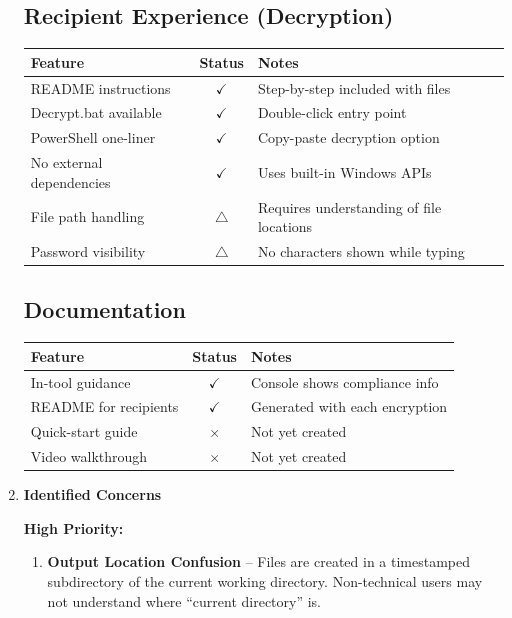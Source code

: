 \documentclass[11pt,letterpaper]{article}
\newcommand{\dmsection}[1]{\item \textbf{#1}\par}
\begin{document}
\begin{enumerate}
\subsection*{Recipient Experience (Decryption)}

\begin{tabularx}{\textwidth}{|l|c|X|}
\hline
\textbf{Feature} & \textbf{Status} & \textbf{Notes} \\
\hline
README instructions & \textcolor{passgreen}{$\checkmark$} & Step-by-step included with files \\
\hline
Decrypt.bat available & \textcolor{passgreen}{$\checkmark$} & Double-click entry point \\
\hline
PowerShell one-liner & \textcolor{passgreen}{$\checkmark$} & Copy-paste decryption option \\
\hline
No external dependencies & \textcolor{passgreen}{$\checkmark$} & Uses built-in Windows APIs \\
\hline
File path handling & \textcolor{warncolor}{$\triangle$} & Requires understanding of file locations \\
\hline
Password visibility & \textcolor{warncolor}{$\triangle$} & No characters shown while typing \\
\hline
\end{tabularx}

\subsection*{Documentation}

\begin{tabularx}{\textwidth}{|l|c|X|}
\hline
\textbf{Feature} & \textbf{Status} & \textbf{Notes} \\
\hline
In-tool guidance & \textcolor{passgreen}{$\checkmark$} & Console shows compliance info \\
\hline
README for recipients & \textcolor{passgreen}{$\checkmark$} & Generated with each encryption \\
\hline
Quick-start guide & \textcolor{failred}{$\times$} & Not yet created \\
\hline
Video walkthrough & \textcolor{failred}{$\times$} & Not yet created \\
\hline
\end{tabularx}

\dmsection{Identified Concerns}

\textbf{High Priority:}
\begin{enumerate}
    \item \textbf{Output Location Confusion} -- Files are created in a timestamped subdirectory of the current working directory. Non-technical users may not understand where ``current directory'' is.


\end{enumerate}
\end{enumerate}
\end{document}
